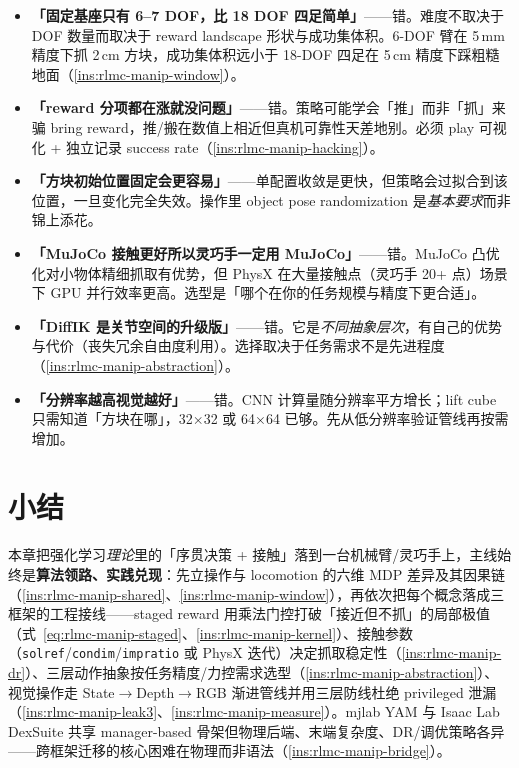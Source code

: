 \begin{pitfall}[本章常见误解一览]
\begin{itemize}
  \item \textbf{「固定基座只有 6--7 DOF，比 18 DOF 四足简单」}——错。难度不取决于 DOF 数量而取决于 reward landscape 形状与成功集体积。6-DOF 臂在 5\,mm 精度下抓 2\,cm 方块，成功集体积远小于 18-DOF 四足在 5\,cm 精度下踩粗糙地面（\cref{ins:rlmc-manip-window}）。
  \item \textbf{「reward 分项都在涨就没问题」}——错。策略可能学会「推」而非「抓」来骗 bring reward，推/搬在数值上相近但真机可靠性天差地别。必须 play 可视化 + 独立记录 success rate（\cref{ins:rlmc-manip-hacking}）。
  \item \textbf{「方块初始位置固定会更容易」}——单配置收敛是更快，但策略会过拟合到该位置，一旦变化完全失效。操作里 object pose randomization 是\emph{基本要求}而非锦上添花。
  \item \textbf{「MuJoCo 接触更好所以灵巧手一定用 MuJoCo」}——错。MuJoCo 凸优化对小物体精细抓取有优势，但 PhysX 在大量接触点（灵巧手 20+ 点）场景下 GPU 并行效率更高。选型是「哪个在你的任务规模与精度下更合适」。
  \item \textbf{「DiffIK 是关节空间的升级版」}——错。它是\emph{不同抽象层次}，有自己的优势与代价（丧失冗余自由度利用）。选择取决于任务需求不是先进程度（\cref{ins:rlmc-manip-abstraction}）。
  \item \textbf{「分辨率越高视觉越好」}——错。CNN 计算量随分辨率平方增长；lift cube 只需知道「方块在哪」，32$\times$32 或 64$\times$64 已够。先从低分辨率验证管线再按需增加。
\end{itemize}
\end{pitfall}

\section*{小结}
\label{sec:rlmc-manip-summary}

本章把强化学习\emph{理论}里的「序贯决策 + 接触」落到一台机械臂/灵巧手上，主线始终是\textbf{算法领路、实践兑现}：先立操作与 locomotion 的六维 MDP 差异及其因果链（\cref{ins:rlmc-manip-shared}、\cref{ins:rlmc-manip-window}），再依次把每个概念落成三框架的工程接线——staged reward 用乘法门控打破「接近但不抓」的局部极值（式~\eqref{eq:rlmc-manip-staged}、\cref{ins:rlmc-manip-kernel}）、接触参数（\verb|solref|/\verb|condim|/\verb|impratio| 或 PhysX 迭代）决定抓取稳定性（\cref{ins:rlmc-manip-dr}）、三层动作抽象按任务精度/力控需求选型（\cref{ins:rlmc-manip-abstraction}）、视觉操作走 State$\to$Depth$\to$RGB 渐进管线并用三层防线杜绝 privileged 泄漏（\cref{ins:rlmc-manip-leak3}、\cref{ins:rlmc-manip-measure}）。mjlab YAM 与 Isaac Lab DexSuite 共享 manager-based 骨架但物理后端、末端复杂度、DR/调优策略各异——跨框架迁移的核心困难在物理而非语法（\cref{ins:rlmc-manip-bridge}）。

